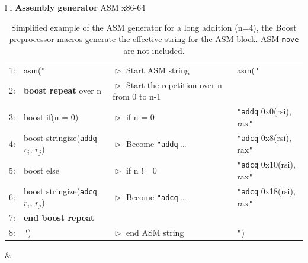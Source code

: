 \documentclass[oribibl]{llncs2e/llncs}
\begin{document}
 \begin{table}[h] 
	\begin{center}
	 	\begin{tabular}{l l}
                           \hline 
                           \textbf{Assembly generator}      \hspace{8.5 cm}  ASM  x86-64 \\ \hline
                           \begin{tabular}{l l l l } 
                               \tiny{1:} &  asm(\texttt{"}     &  $\vartriangleright$ Start ASM string & asm(\texttt{"} \\
                               \tiny{2:} &  \textbf{boost  repeat} over n  &$\vartriangleright$  Start the repetition over n from 0 to n-1 &   \\
                               \tiny{3:} &   \hspace{0.2 cm}  boost  if(n = 0) &  $\vartriangleright$   if n = 0 &  \hspace{0.2 cm}  \texttt{"}\texttt{addq} 0x0(rsi), rax\texttt{"}\\    
                               \tiny{4:} &   \hspace{0.4 cm}  boost stringize(\texttt{addq}  $r_i$, $r_j$)  &$\vartriangleright$   Become \texttt{"addq} \dots &  \hspace{0.2 cm}    \texttt{"}\texttt{adcq}  0x8(rsi), rax\texttt{"}\\    
                               \tiny{5:} &   \hspace{0.2 cm}  boost  else  & $\vartriangleright$   if n != 0 &  \hspace{0.2 cm}  \texttt{"}\texttt{adcq}  0x10(rsi), rax\texttt{"} \\ 
                               \tiny{6:} &   \hspace{0.4 cm}  boost stringize(\texttt{adcq}  $r_i$, $r_j$)  &$\vartriangleright$   Become \texttt{"adcq} \dots &  \hspace{0.2 cm}   \texttt{"}\texttt{adcq}  0x18(rsi), rax\texttt{"}\\     
                               \tiny{7:} &  \textbf{end boost repeat} &  &   \\                            
                               \tiny{8:} &  \texttt{"})  &  $\vartriangleright$ end ASM string & \texttt{"})\\
                          \end{tabular} &  \\ \hline
		 \end{tabular} 
		 \caption{Simplified  example of the ASM generator for a long addition (n=4), the Boost preprocessor macros generate the effective string for the ASM block. ASM \texttt{move} are not included. \label{ASMGENERATOR}  }
	\end{center}
\end{table} 
\end{document}
